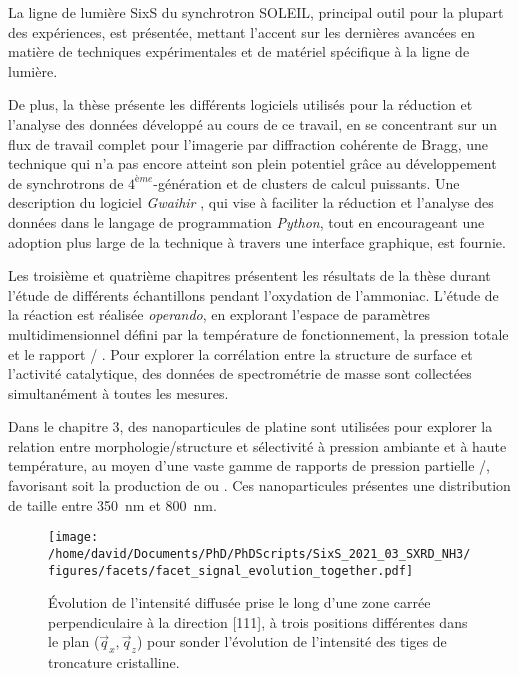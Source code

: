 La ligne de lumière SixS du synchrotron SOLEIL, principal outil pour la plupart des expériences, est présentée, mettant l'accent sur les dernières avancées en matière de techniques expérimentales et de matériel spécifique à la ligne de lumière.

De plus, la thèse présente les différents logiciels utilisés pour la réduction et l'analyse des données développé au cours de ce travail, en se concentrant sur un flux de travail complet pour l'imagerie par diffraction cohérente de Bragg, une technique qui n'a pas encore atteint son plein potentiel grâce au développement de synchrotrons de $4^{ème}$-génération et de clusters de calcul puissants.
Une description du logiciel \textit{Gwaihir} \parencite{Simonne2022}, qui vise à faciliter la réduction et l'analyse des données dans le langage de programmation \textit{Python}, tout en encourageant une adoption plus large de la technique à travers une interface graphique, est fournie.

Les troisième et quatrième chapitres présentent les résultats de la thèse durant l'étude de différents échantillons pendant l'oxydation de l'ammoniac.
L'étude de la réaction est réalisée \textit{operando}, en explorant l'espace de paramètres multidimensionnel défini par la température de fonctionnement, la pression totale et le rapport  / .
Pour explorer la corrélation entre la structure de surface et l'activité catalytique, des données de spectrométrie de masse sont collectées simultanément à toutes les mesures.

Dans le chapitre 3, des nanoparticules de platine sont utilisées pour explorer la relation entre morphologie/structure et sélectivité à pression ambiante et à haute température, au moyen d'une vaste gamme de rapports de pression partielle /, favorisant soit la production de  ou .
Ces nanoparticules présentes une distribution de taille entre \qty{350}{\nm} et \qty{800}{\nm}.

\begin{figure}[!htb]
    \centering
    \texttt{[image: /home/david/Documents/PhD/PhDScripts/SixS\_2021\_03\_SXRD\_NH3/figures/facets/facet\_signal\_evolution\_together.pdf]}
    \caption{
    Évolution de l'intensité diffusée prise le long d'une zone carrée perpendiculaire à la direction [111], à trois positions différentes dans le plan ($\vec{q}_x, \vec{q}_z$) pour sonder l'évolution de l'intensité des tiges de troncature cristalline.
    }
    \label{fig:FacetSignalFr}
\end{figure}


